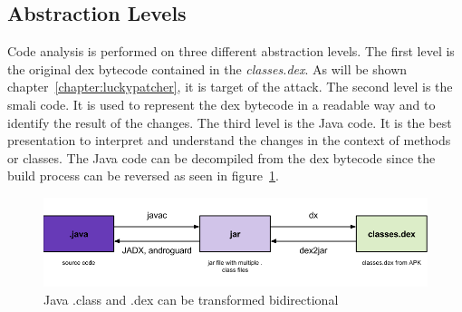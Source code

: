 \subsection{Abstraction Levels}
Code analysis is performed on three different abstraction levels.
\newline
The first level is the original dex bytecode contained in the \textit{classes.dex}.
As will be shown chapter~\ref{chapter:luckypatcher}, it is target of the attack.
\newline
The second level is the smali code.
It is used to represent the dex bytecode in a readable way and to identify the result of the changes.
\newline
The third level is the Java code.
It is the best presentation to interpret and understand the changes in the context of methods or classes.
\newline
The Java code can be decompiled from the dex bytecode since the build process can be reversed as seen in figure~\ref{fig:re1}.
\newline
\begin{figure}[h]
    \centering
    \includegraphics[width=1\textwidth]{data/re1.png}
    \caption{Java .class and .dex can be transformed bidirectional \cite{andevconDalvikART}}
    \label{fig:re1}
\end{figure}

